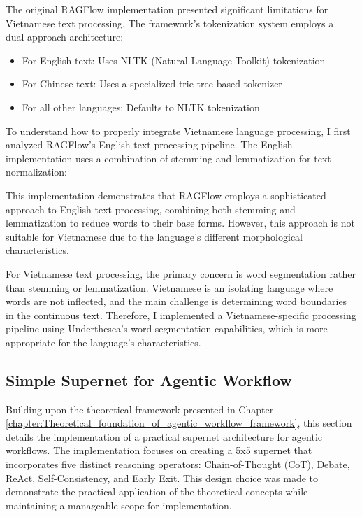 \documentclass[../Main.tex]{subfiles}
\begin{document}
The original RAGFlow implementation presented significant limitations for Vietnamese text processing. The framework's tokenization system employs a dual-approach architecture:

\begin{itemize}
    \item For English text: Uses NLTK (Natural Language Toolkit) tokenization
    \item For Chinese text: Uses a specialized trie tree-based tokenizer
    \item For all other languages: Defaults to NLTK tokenization
\end{itemize}

To understand how to properly integrate Vietnamese language processing, I first analyzed RAGFlow's English text processing pipeline. The English implementation uses a combination of stemming and lemmatization for text normalization:



This implementation demonstrates that RAGFlow employs a sophisticated approach to English text processing, combining both stemming and lemmatization to reduce words to their base forms. However, this approach is not suitable for Vietnamese due to the language's different morphological characteristics.

For Vietnamese text processing, the primary concern is word segmentation rather than stemming or lemmatization. Vietnamese is an isolating language where words are not inflected, and the main challenge is determining word boundaries in the continuous text. Therefore, I implemented a Vietnamese-specific processing pipeline using Underthesea's word segmentation capabilities, which is more appropriate for the language's characteristics.

\subsection{Simple Supernet for Agentic Workflow}
\label{section:5.1.3_simple_supernet_for_agentic_workflow}

Building upon the theoretical framework presented in Chapter \ref{chapter:Theoretical_foundation_of_agentic_workflow_framework}, this section details the implementation of a practical supernet architecture for agentic workflows. The implementation focuses on creating a 5x5 supernet that incorporates five distinct reasoning operators: Chain-of-Thought (CoT), Debate, ReAct, Self-Consistency, and Early Exit. This design choice was made to demonstrate the practical application of the theoretical concepts while maintaining a manageable scope for implementation.
\end{document}
